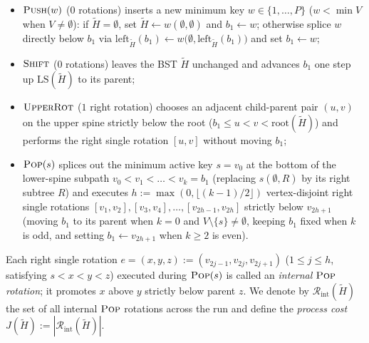 \documentclass[11pt]{article}
\theoremstyle{definition}
\theoremstyle{remark}
\newcommand{\LS}{\mathrm{LS}}
\newcommand{\PUSH}{\textnormal{\scshape Push}}
\newcommand{\POP}{\textnormal{\scshape Pop}}
\newcommand{\SHIFT}{\textnormal{\scshape Shift}}
\newcommand{\UPROT}{\textnormal{\scshape UpperRot}}
\begin{document}
\begin{itemize}[leftmargin=2em, itemsep=1pt]
  \item $\PUSH(w)$ ($0$ rotations) inserts a new minimum key $w \in \{1, \dots, P\}$ ($w < \min V$ when $V \ne \emptyset$): if $\widetilde{H} = \emptyset$, set $\widetilde{H} \gets w(\emptyset, \emptyset)$ and $b_1 \gets w$; otherwise splice $w$ directly below $b_1$ via $\mathrm{left}_{\widetilde{H}}(b_1) \gets w\big(\emptyset, \mathrm{left}_{\widetilde{H}}(b_1)\big)$ and set $b_1 \gets w$;
  \item $\SHIFT$ ($0$ rotations) leaves the BST $\widetilde{H}$ unchanged and advances $b_1$ one step up $\LS(\widetilde{H})$ to its parent;
  \item $\UPROT$ ($1$ right rotation) chooses an adjacent child-parent pair $(u, v)$ on the upper spine strictly below the root ($b_1 \le u < v < \mathrm{root}(\widetilde{H})$) and performs the right single rotation $[u, v]$ without moving $b_1$;
  \item $\POP(s)$ splices out the minimum active key $s = v_0$ at the bottom of the lower-spine subpath $v_0 < v_1 < \dots < v_k = b_1$ (replacing $s(\emptyset, R)$ by its right subtree $R$) and executes $h := \max(0, \lfloor (k - 1)/2 \rfloor)$ vertex-disjoint right single rotations $[v_1, v_2], [v_3, v_4], \dots, [v_{2h-1}, v_{2h}]$ strictly below $v_{2h+1}$ (moving $b_1$ to its parent when $k = 0$ and $V \setminus \{s\} \ne \emptyset$, keeping $b_1$ fixed when $k$ is odd, and setting $b_1 \gets v_{2h+1}$ when $k \ge 2$ is even).
\end{itemize}
Each right single rotation $e = (x, y, z) := (v_{2j-1}, v_{2j}, v_{2j+1})$ ($1 \le j \le h$, satisfying $s < x < y < z$) executed during $\POP(s)$ is called an \emph{internal $\POP$ rotation}; it promotes $x$ above $y$ strictly below parent $z$. We denote by $\mathcal{R}_{\mathrm{int}}(\widetilde{H})$ the set of all internal $\POP$ rotations across the run and define the \emph{process cost} $J(\widetilde{H}) := |\mathcal{R}_{\mathrm{int}}(\widetilde{H})|$.
\end{document}
